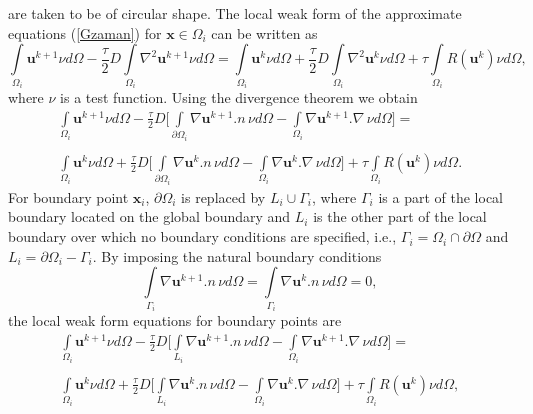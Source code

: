 \documentclass[12pt]{article}
\numberwithin{equation}{section}
\begin{document}
are taken to be of circular shape. The local weak form of the approximate equations (\ref{Gzaman}) for $\mathbf{x}\in \Omega _i$
can be written as
\begin{equation}
\int\limits_{{\Omega _i}} {{\mathbf{u}^{k + 1}}\nu d\Omega }  - \frac{\tau }{2}D\int\limits_{{\Omega _i}} {{\nabla ^2}{\mathbf{u}^{k + 1}}\nu d\Omega }  = \int\limits_{{\Omega _i}} {{\mathbf{u}^k}\nu d\Omega }  + \frac{\tau }{2}D\int\limits_{{\Omega _i}} {{\nabla ^2}{\mathbf{u}^k}\nu d\Omega }  + \tau \int\limits_{{\Omega _i}} {R({\mathbf{u}^k})\nu d\Omega } ,\end{equation}
where $\nu$ is a test function. Using the divergence theorem we obtain
\begin{equation}\label{FDI}
\begin{array}{l}
\int\limits_{{\Omega _i}} {{\mathbf{u}^{k + 1}}\nu d\Omega }  - \frac{\tau }{2}D\Big[\int\limits_{{\partial \Omega _i}} {\nabla {\mathbf{u}^{k + 1}}.n\,\nu d\Omega }  - \int\limits_{{\Omega _i}} {\nabla {\mathbf{u}^{k + 1}}.\nabla \,\nu d\Omega } \Big] = \\\\
\int\limits_{{\Omega _i}} {{\mathbf{u}^k}\nu d\Omega }  + \frac{\tau }{2}D\Big[\int\limits_{{\partial \Omega _i}} {\nabla {\mathbf{u}^k}.n\,\nu d\Omega }  - \int\limits_{{\Omega _i}} {\nabla {\mathbf{u}^k}.\nabla \,\nu d\Omega } \Big] + \tau \int\limits_{{\Omega _i}} {R({\mathbf{u}^k})\nu d\Omega } .
\end{array}\end{equation}
For boundary point $\mathbf{x}_i$, $\partial \Omega _i$ is replaced by $L_i \cup \Gamma _i$, where $\Gamma _i$
is a part of the local boundary located on the global boundary
and $L_i$ is the other part of the local boundary over which no
boundary conditions are specified, i.e., $\Gamma _i = \Omega _{i} \cap \partial \Omega $ and $L_i = \partial \Omega _{i} - \Gamma _i$. By imposing the natural boundary conditions
\begin{equation}\int\limits_{{\Gamma _i}} {\nabla {\mathbf{u}^{k + 1}}.n\,\nu d\Omega }  = \int\limits_{{\Gamma _i}} {\nabla {\mathbf{u}^k}.n\,\nu d\Omega }  = 0,\end{equation}
the local weak form equations for boundary points are
\begin{equation}\label{FDB}
\begin{array}{l}
\int\limits_{{\Omega _i}} {{\mathbf{u}^{k + 1}}\nu d\Omega }  - \frac{\tau }{2}D\Big[\int\limits_{{L _i}} {\nabla {\mathbf{u}^{k + 1}}.n\,\nu d\Omega }  - \int\limits_{{\Omega _i}} {\nabla {\mathbf{u}^{k + 1}}.\nabla \,\nu d\Omega } \Big] = \\\\
\int\limits_{{\Omega _i}} {{\mathbf{u}^k}\nu d\Omega }  + \frac{\tau }{2}D\Big[\int\limits_{{L _i}} {\nabla {\mathbf{u}^k}.n\,\nu d\Omega }  - \int\limits_{{\Omega _i}} {\nabla {\mathbf{u}^k}.\nabla \,\nu d\Omega } \Big] + \tau \int\limits_{{\Omega _i}} {R({\mathbf{u}^k})\nu d\Omega } ,
\end{array}\end{equation}
\end{document}
